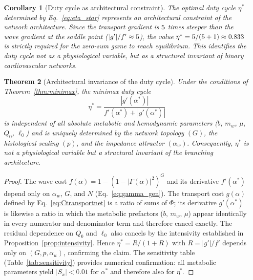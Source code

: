\documentclass[11pt,a4paper]{article}
\newtheorem{theorem}{Theorem}
\newtheorem{corollary}[theorem]{Corollary}
\theoremstyle{remark}
\begin{document}
\begin{corollary}[Duty cycle as architectural constraint]
\label{cor:eigenvalue}
The optimal duty cycle $\eta^*$ determined by Eq.~\eqref{eq:eta_star} represents
an architectural constraint of the network architecture. Since the transport
gradient is $5$ times steeper than the wave gradient at the
saddle point ($|g'|/f' \approx 5$), the value $\eta^* =
5/(5+1) \approx 0.833$ is strictly
required for the zero-sum game to reach equilibrium. This identifies the duty
cycle not as a physiological variable, but as a structural invariant of binary
cardiovascular networks.
\end{corollary}

\begin{theorem}[Architectural invariance of the duty cycle]
\label{thm:eta_invariant}
Under the conditions of Theorem~\ref{thm:minimax}, the minimax duty cycle
\[
  \eta^* = \frac{|g'(\alpha^*)|}{f'(\alpha^*) + |g'(\alpha^*)|}
\]
is independent of all absolute metabolic and hemodynamic parameters
($b$, $m_w$, $\mu$, $Q_0$, $\ell_0$) and is uniquely determined by the
network topology $(G)$, the histological scaling $(p)$, and the impedance
attractor $(\alpha_w)$. Consequently, $\eta^*$ is not a physiological
variable but a structural invariant of the branching architecture.
\end{theorem}
\begin{proof}
The wave cost $f(\alpha) = 1-(1-|\Gamma(\alpha)|^2)^G$ and its derivative
$f'(\alpha^*)$ depend only on $\alpha_w$, $G$, and $N$ (Eq.~\eqref{eq:gamma_gen}).
The transport cost $g(\alpha)$ defined by Eq.~\eqref{eq:Ctransportnet} is a
ratio of sums of $\Phi$; its derivative $g'(\alpha^*)$ is likewise a ratio
in which the metabolic prefactors ($b$, $m_w$, $\mu$) appear identically
in every numerator and denominator term and therefore cancel exactly.
The residual dependence on $Q_0$ and $\ell_0$ also cancels by the
intensivity established in Proposition~\ref{prop:intensivity}.
Hence $\eta^* = R/(1+R)$ with $R = |g'|/f'$ depends only on
$(G, p, \alpha_w)$, confirming the claim.
The sensitivity table (Table~\ref{tab:sensitivity}) provides numerical
confirmation: all metabolic parameters yield $|S_x| < 0.01$ for $\alpha^*$
and therefore also for $\eta^*$.
\end{proof}
\end{document}
